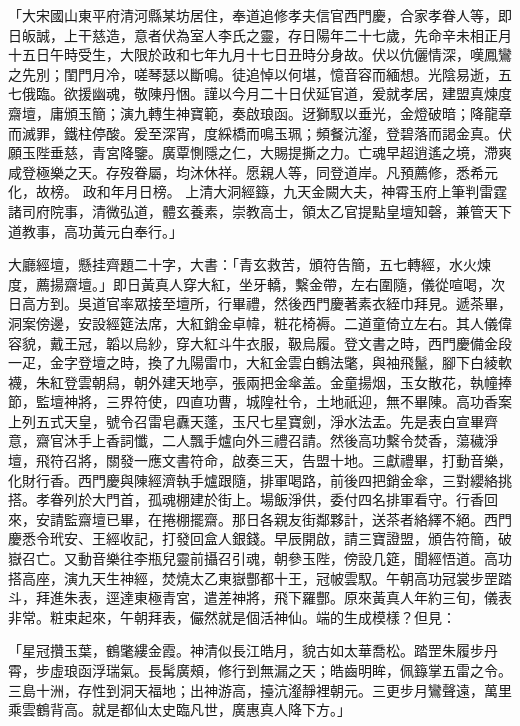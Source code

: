 \begin{showcontents}{}
「大宋國山東平府清河縣某坊居住，奉道追修孝夫信官西門慶，合家孝眷人等，即日皈誠，上干慈造，意者伏為室人李氏之靈，存日陽年二十七歲，先命辛未相正月十五日午時受生，大限於政和七年九月十七日丑時分身故。伏以伉儷情深，嘆鳳鸞之先別；閨門月冷，嗟琴瑟以斷鳴。徒追悼以何堪，憶音容而緬想。光陰易逝，五七俄臨。欲援幽魂，敬陳丹悃。謹以今月二十日伏延官道，爰就孝居，建盟真煉度齋壇，庸頒玉簡；演九轉生神寶範，奏啟琅函。迓獅馭以垂光，金燈破暗；降龍章而滅罪，鐵柱停酸。爰至深宵，度綵橋而鳴玉珮；頻餐沆瀣，登碧落而謁金真。伏願玉陛垂慈，青宮降鑒。廣覃惻隱之仁，大賜提撕之力。亡魂早超逍遙之境，滯爽咸登極樂之天。存歿眷屬，均沐休祥。愿親人等，同登道岸。凡預薦修，悉希元化，故榜。 政和年月日榜。 上清大洞經籙，九天金闕大夫，神霄玉府上筆判雷霆諸司府院事，清微弘道，體玄養素，崇教高士，領太乙官提點皇壇知磬，兼管天下道教事，高功黃元白奉行。」

大廳經壇，懸挂齊題二十字，大書：「青玄救苦，頒符告簡，五七轉經，水火煉度，薦揚齋壇。」即日黃真人穿大紅，坐牙轎，繫金帶，左右圍隨，儀從喧喝，次日高方到。吳道官率眾接至壇所，行畢禮，然後西門慶著素衣絰巾拜見。遞茶畢，洞案傍邊，安設經筵法席，大紅銷金卓幃，粧花椅褥。二道童倚立左右。其人儀偉容貌，戴王冠，韜以烏紗，穿大紅斗牛衣服，靸烏履。登文書之時，西門慶備金段一疋，金字登壇之時，換了九陽雷巾，大紅金雲白鶴法氅，與袖飛鬣，腳下白綾軟襪，朱紅登雲朝舄，朝外建天地亭，張兩把金傘盖。金童揚烟，玉女散花，執幢捧節，監壇神將，三界符使，四直功曹，城隍社令，土地祇迎，無不畢陳。高功香案上列五式天皇，號令召雷皂纛天蓬，玉尺七星寶劍，淨水法盂。先是表白宣畢齊意，齋官沐手上香詞懺，二人飄手爐向外三禮召請。然後高功繫令焚香，蕩穢淨壇，飛符召將，關發一應文書符命，啟奏三天，告盟十地。三獻禮畢，打動音樂，化財行香。西門慶與陳經濟執手爐跟隨，排軍喝路，前後四把銷金傘，三對纓絡挑搭。孝眷列於大門首，孤魂棚建於街上。場飯淨供，委付四名排軍看守。行香回來，安請監齋壇已畢，在捲棚擺齋。那日各親友街鄰夥計，送茶者絡繹不絕。西門慶悉令玳安、王經收記，打發回盒人銀錢。早辰開啟，請三寶證盟，頒告符簡，破嶽召亡。又動音樂往李瓶兒靈前攝召引魂，朝參玉陛，傍設几筵，聞經悟道。高功搭高座，演九天生神經，焚燒太乙東嶽酆都十王，冠帔雲馭。午朝高功冠裳步罡踏斗，拜進朱表，逕達東極青宮，遣差神將，飛下羅酆。原來黃真人年約三旬，儀表非常。粧束起來，午朝拜表，儼然就是個活神仙。端的生成模樣？但見：

「星冠攢玉葉，鶴氅縷金霞。神清似長江皓月，貌古如太華喬松。踏罡朱履步丹霄，步虛琅函浮瑞氣。長髯廣頰，修行到無漏之天；皓齒明眸，佩籙掌五雷之令。三島十洲，存性到洞天福地；出神游高，擡沆瀣靜裡朝元。三更步月鸞聲遠，萬里乘雲鶴背高。就是都仙太史臨凡世，廣惠真人降下方。」


\end{showcontents}
